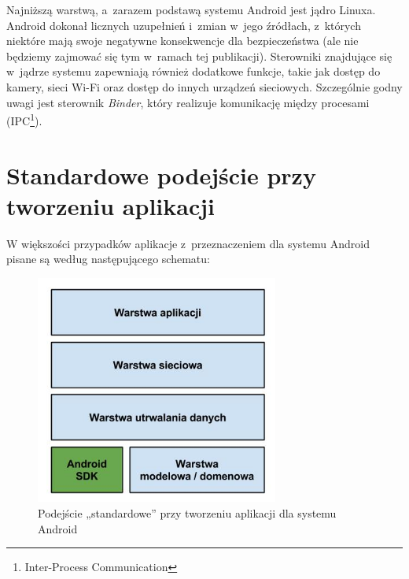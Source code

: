 Najniższą warstwą, a~zarazem podstawą systemu Android jest jądro Linuxa. Android dokonał licznych uzupełnień i~zmian w~jego źródłach, z~których niektóre mają swoje negatywne konsekwencje dla bezpieczeństwa (ale nie będziemy zajmować się tym w~ramach tej publikacji). Sterowniki znajdujące się w~jądrze systemu zapewniają również dodatkowe funkcje, takie jak dostęp do kamery, sieci Wi-Fi oraz dostęp do innych urządzeń sieciowych. Szczególnie godny uwagi jest sterownik \textit{Binder}, który realizuje komunikację między procesami\cite{bib:hacker:handbook} (IPC\footnote{Inter-Process Communication}).

\section{Standardowe podejście przy tworzeniu aplikacji}
\label{standardowe_podejscie}
W większości przypadków aplikacje z~przeznaczeniem dla systemu Android pisane są według następującego schematu:

\begin{figure}[!htb]
    \centering
    \includegraphics[width=8cm]{imgs/ch3_opis_problemu_1.jpg}
    \caption
{Podejście „standardowe” przy tworzeniu aplikacji dla systemu Android}
    \label{fig:opis_problemu}
\end{figure} 

